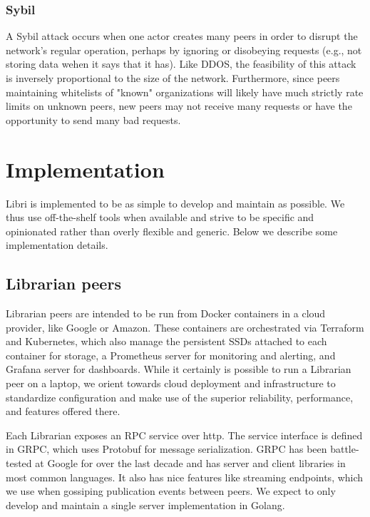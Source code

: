\documentclass[10pt]{article}
\begin{document}
\subsubsection{Sybil}
A Sybil attack occurs when one actor creates many peers in order to disrupt the network's regular operation, perhaps by ignoring or disobeying requests (e.g., not storing data wehen it says that it has). Like DDOS, the feasibility of this attack is inversely proportional to the size of the network. Furthermore, since peers maintaining whitelists of "known" organizations will likely have much strictly rate limits on unknown peers, new peers may not receive many requests or have the opportunity to send many bad requests.



\section{Implementation}
\label{sec:impl}

Libri is implemented to be as simple to develop and maintain as possible. We thus use off-the-shelf tools when available and strive to be specific and opinionated rather than overly flexible and generic. Below we describe some implementation details. 

\subsection{Librarian peers}
Librarian peers are intended to be run from Docker containers in a cloud provider, like Google or Amazon. These containers are orchestrated via Terraform and Kubernetes, which also manage the persistent SSDs attached to each container for storage, a Prometheus server for monitoring and alerting, and Grafana server for dashboards. While it certainly is possible to run a Librarian peer on a laptop, we orient towards cloud deployment and infrastructure to standardize configuration and make use of the superior reliability, performance, and features offered there. 

Each Librarian exposes an RPC service over http. The service interface is defined in GRPC, which uses Protobuf for message serialization. GRPC has been battle-tested at Google for over the last decade and has server and client libraries in most common languages. It also has nice features like streaming endpoints, which we use when gossiping publication events between peers. We expect to only develop and maintain a single server implementation in Golang. 
\end{document}
